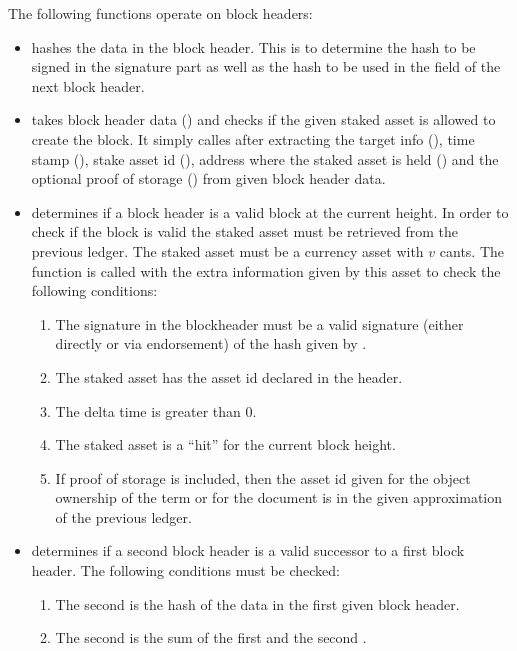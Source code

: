 The following functions operate on block headers:
\begin{itemize}
\item {} hashes the data in the block header. This is to determine
the hash to be signed in the signature part
as well as the hash to be used in the {} field of the next block header.
\item {} takes block header data ({})
and checks if the given staked asset is allowed to create the block.
It simply calles {} after
extracting the target info ({}), time stamp ({}),
stake asset id ({}),
address where the staked asset is held ({})
and the optional proof of storage ({})
from given block header data.
\item {} determines if a block header is a valid block at the current height.
In order to check if the block is valid the staked asset must be retrieved from
the previous ledger.
The staked asset must be a currency asset with $v$ cants.
The function {} is called with the extra information given by this asset
to check the following conditions:
\begin{enumerate}
\item The signature in the blockheader must be a valid signature (either directly or via endorsement) of the hash given by {}.
\item The staked asset has the asset id declared in the header.
\item The delta time is greater than $0$.
\item The staked asset is a ``hit'' for the current block height.
\item If proof of storage is included, then the asset id given for the
object ownership of the term or
for the document
is in the given approximation of the previous ledger.
\end{enumerate}
\item {} determines if a second block header is a valid successor to a first block header.
The following conditions must be checked:
\begin{enumerate}
\item The second {} is the hash of the data in the first given block header.
\item The second {} is the sum of the first {} and the second {}.

\end{enumerate}
\end{itemize}
